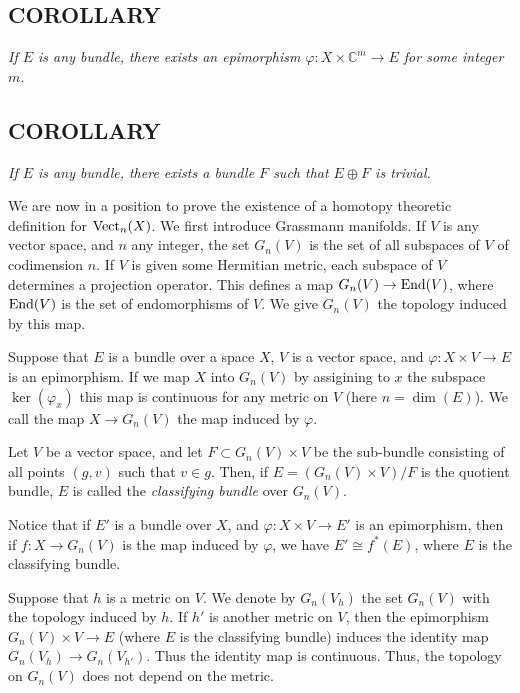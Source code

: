 \subsection{COROLLARY}\label{cor:1.4.13} \textit{If $E$ is any bundle, there exists an epimorphism $\varphi: X \times \mathbb{C}^m \to E$ for some integer $m$.}

\subsection{COROLLARY}\label{cor:1.4.14} \textit{If $E$ is any bundle, there exists a bundle $F$ such that $E \oplus F$ is trivial.} \par 

We are now in a position to prove the existence of a homotopy theoretic definition for $\operatorname{Vect}_n(X)$. We first introduce Grassmann manifolds. If $V$ is any vector space, and $n$ any integer, the set $G_n(V)$ is the set of all subspaces of $V$ of codimension $n$. If $V$ is given some Hermitian metric, each subspace of $V$ determines a projection operator. This defines a map $G_n(V) \to \operatorname{End}(V)$, where $\operatorname{End}(V)$ is the set of endomorphisms of $V$. We give $G_n(V)$ the topology induced by this map. \par 

Suppose that $E$ is a bundle over a space $X$, $V$ is a vector space, and $\varphi: X \times V \to E$ is an epimorphism. If we map $X$ into $G_n(V)$ by assigining to $x$ the subspace $\ker(\varphi_x)$ this map is continuous for any metric on $V$ (here $n = \dim(E)$). We call the map $X \to G_n(V)$ the map induced by $\varphi$. \par 

Let $V$ be a vector space, and let $F \subset G_n(V) \times V$ be the sub-bundle consisting of all points $(g, v)$ such that $v \in g$. Then, if $E = (G_n(V) \times V)/F$ is the quotient bundle, $E$ is called the \textit{classifying bundle} over $G_n(V)$. \par 

Notice that if $E'$ is a bundle over $X$, and $\varphi: X \times V \to E'$ is an epimorphism, then if $f: X \to G_n(V)$ is the map induced by $\varphi$, we have $E' \cong f^*(E)$, where $E$ is the classifying bundle. \par 

Suppose that $h$ is a metric on $V$. We denote by $G_n(V_h)$ the set $G_n(V)$ with the topology induced by $h$. If $h'$ is another metric on $V$, then the epimorphism  $G_n(V) \times V \to E$ (where $E$ is the classifying bundle) induces the identity map  $G_n(V_h) \to G_n(V_{h'})$. Thus the identity map is continuous. Thus, the topology on $G_n(V)$ does not depend on the metric. \par 

